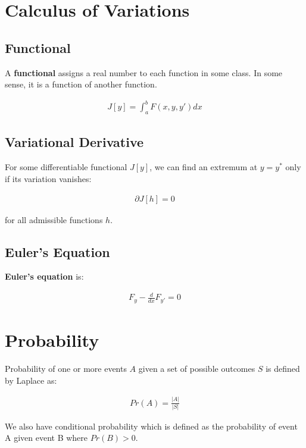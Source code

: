 \documentclass[11pt]{article}
\begin{document}
\section{Calculus of Variations}
\label{sec:org05456e4}
\subsection{Functional}
\label{sec:org7e875a6}
A \textbf{functional} assigns a real number to each function in some class. In some sense, it is a function of another function.

\begin{align*}
    J\left[y\right] = \int_{a}^{b} F\left(x, y, y'\right)dx
\end{align*}

\subsection{Variational Derivative}
\label{sec:orgd4695fd}
For some differentiable functional \(J\left[y\right]\), we can find an extremum at \(y = y^{*}\) only if its variation vanishes:

\begin{align*}
    \partial J\left[h\right] = 0
\end{align*}

for all admissible functions \(h\).

\subsection{Euler's Equation}
\label{sec:orgbe69ef7}
\textbf{Euler's equation} is:

\begin{align*}
    F_{y} - \frac{d}{dx}F_{y'} = 0
\end{align*}

\section{Probability}
\label{sec:org9370c13}
Probability of one or more events \(A\) given a set of possible outcomes \(S\) is defined by Laplace as:

\begin{align*}
    Pr\left(A\right) = \frac{\vert A \vert}{\vert S \vert}
\end{align*}

We also have conditional probability which is defined as the probability of event A given event B where \(Pr\left(B\right) > 0\).
\end{document}
